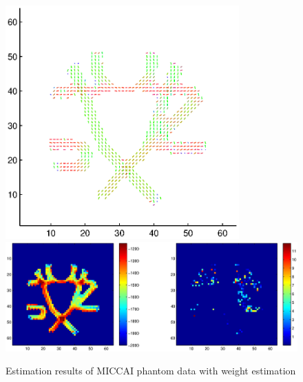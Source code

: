 \documentclass{article}
\begin{document}
\begin{enumerate}
    \begin{figure}[H]
      \caption{\label{figPhantomWeights}Estimation results of MICCAI phantom data with weight estimation}
      \centering
      \includegraphics[width=0.8\textwidth]{figures/phantom_weights.eps}
      \includegraphics[width=\textwidth]{figures/phantom_weights_like.eps}
    \end{figure}
\end{enumerate}

\end{document}
